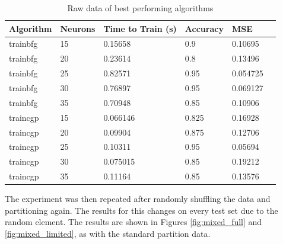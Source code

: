 \documentclass[a4paper, 10pt, conference]{ieeeconf}
\begin{document}



\begin{table}
\centering
\caption{Raw data of best performing algorithms}
\label{tbl:unmixed}
\begin{tabular}{llllll}
\hline
\textbf{Algorithm} & \textbf{Neurons} & \textbf{Time to Train (s)} & \textbf{Accuracy} & \textbf{MSE} \\ \hline
trainbfg & 15 & 0.15658 & 0.9 & 0.10695 \\ \hline 
trainbfg & 20 & 0.23614 & 0.8 & 0.13496 \\ \hline 
trainbfg & 25 & 0.82571 & 0.95 & 0.054725 \\ \hline 
trainbfg & 30 & 0.76897 & 0.95 & 0.069127 \\ \hline 
trainbfg & 35 & 0.70948 & 0.85 & 0.10906 \\ \hline

traincgp & 15 & 0.066146 & 0.825 & 0.16928 \\ \hline 
traincgp & 20 & 0.09904 & 0.875 & 0.12706 \\ \hline 
traincgp & 25 & 0.10311 & 0.95 & 0.05694 \\ \hline 
traincgp & 30 & 0.075015 & 0.85 & 0.19212 \\ \hline 
traincgp & 35 & 0.11164 & 0.85 & 0.13576 \\ \hline 
\end{tabular}
\end{table}

The experiment was then repeated after randomly shuffling the data and partitioning again. The results for this changes on every test set due to the random element. The results are shown in Figures \ref{fig:mixed_full} and \ref{fig:mixed_limited}, as with the standard partition data.
\end{document}
